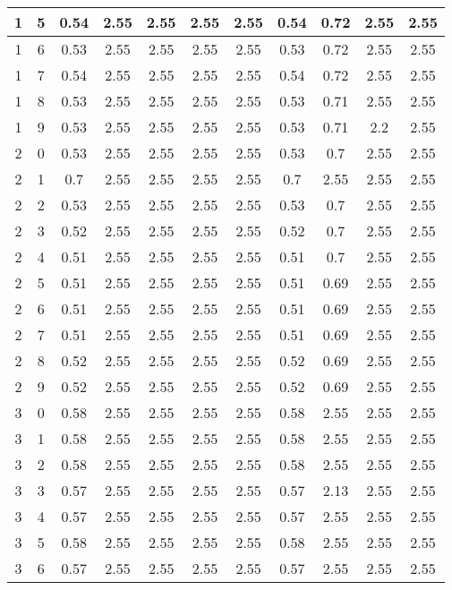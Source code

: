 \begin{longtable}{|c|c||c||c|c|c|c||c|c|c|c|}
	1 & 5 & 0.54 & 2.55 & 2.55 & 2.55 & 2.55 & 0.54 & 0.72 & 2.55 & 2.55 \\ \hline
	1 & 6 & 0.53 & 2.55 & 2.55 & 2.55 & 2.55 & 0.53 & 0.72 & 2.55 & 2.55 \\ \hline
	1 & 7 & 0.54 & 2.55 & 2.55 & 2.55 & 2.55 & 0.54 & 0.72 & 2.55 & 2.55 \\ \hline
	1 & 8 & 0.53 & 2.55 & 2.55 & 2.55 & 2.55 & 0.53 & 0.71 & 2.55 & 2.55 \\ \hline
	1 & 9 & 0.53 & 2.55 & 2.55 & 2.55 & 2.55 & 0.53 & 0.71 & 2.2 & 2.55 \\ \hline
	2 & 0 & 0.53 & 2.55 & 2.55 & 2.55 & 2.55 & 0.53 & 0.7 & 2.55 & 2.55 \\ \hline
	2 & 1 & 0.7 & 2.55 & 2.55 & 2.55 & 2.55 & 0.7 & 2.55 & 2.55 & 2.55 \\ \hline
	2 & 2 & 0.53 & 2.55 & 2.55 & 2.55 & 2.55 & 0.53 & 0.7 & 2.55 & 2.55 \\ \hline
	2 & 3 & 0.52 & 2.55 & 2.55 & 2.55 & 2.55 & 0.52 & 0.7 & 2.55 & 2.55 \\ \hline
	2 & 4 & 0.51 & 2.55 & 2.55 & 2.55 & 2.55 & 0.51 & 0.7 & 2.55 & 2.55 \\ \hline
	2 & 5 & 0.51 & 2.55 & 2.55 & 2.55 & 2.55 & 0.51 & 0.69 & 2.55 & 2.55 \\ \hline
	2 & 6 & 0.51 & 2.55 & 2.55 & 2.55 & 2.55 & 0.51 & 0.69 & 2.55 & 2.55 \\ \hline
	2 & 7 & 0.51 & 2.55 & 2.55 & 2.55 & 2.55 & 0.51 & 0.69 & 2.55 & 2.55 \\ \hline
	2 & 8 & 0.52 & 2.55 & 2.55 & 2.55 & 2.55 & 0.52 & 0.69 & 2.55 & 2.55 \\ \hline
	2 & 9 & 0.52 & 2.55 & 2.55 & 2.55 & 2.55 & 0.52 & 0.69 & 2.55 & 2.55 \\ \hline
	3 & 0 & 0.58 & 2.55 & 2.55 & 2.55 & 2.55 & 0.58 & 2.55 & 2.55 & 2.55 \\ \hline
	3 & 1 & 0.58 & 2.55 & 2.55 & 2.55 & 2.55 & 0.58 & 2.55 & 2.55 & 2.55 \\ \hline
	3 & 2 & 0.58 & 2.55 & 2.55 & 2.55 & 2.55 & 0.58 & 2.55 & 2.55 & 2.55 \\ \hline
	3 & 3 & 0.57 & 2.55 & 2.55 & 2.55 & 2.55 & 0.57 & 2.13 & 2.55 & 2.55 \\ \hline
	3 & 4 & 0.57 & 2.55 & 2.55 & 2.55 & 2.55 & 0.57 & 2.55 & 2.55 & 2.55 \\ \hline
	3 & 5 & 0.58 & 2.55 & 2.55 & 2.55 & 2.55 & 0.58 & 2.55 & 2.55 & 2.55 \\ \hline
	3 & 6 & 0.57 & 2.55 & 2.55 & 2.55 & 2.55 & 0.57 & 2.55 & 2.55 & 2.55 \\ \hline

\end{longtable}
